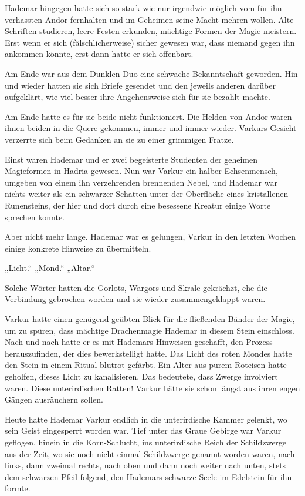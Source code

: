 \documentclass[10pt, a4paper, oneside]{book}
\begin{document}
Hademar hingegen hatte sich so stark wie nur irgendwie möglich vom für ihn verhassten Andor fernhalten und im Geheimen seine Macht mehren wollen. Alte Schriften studieren, leere Festen erkunden, mächtige Formen der Magie meistern. Erst wenn er sich (fälschlicherweise) sicher gewesen war, dass niemand gegen ihn ankommen könnte, erst dann hatte er sich offenbart.

Am Ende war aus dem Dunklen Duo eine schwache Bekanntschaft geworden. Hin und wieder hatten sie sich Briefe gesendet und den jeweils anderen darüber aufgeklärt, wie viel besser ihre Angehensweise sich für sie bezahlt machte.

Am Ende hatte es für sie beide nicht funktioniert. Die Helden von Andor waren ihnen beiden in die Quere gekommen, immer und immer wieder. Varkurs Gesicht verzerrte sich beim Gedanken an sie zu einer grimmigen Fratze.

Einst waren Hademar und er zwei begeisterte Studenten der geheimen Magieformen in Hadria gewesen. Nun war Varkur ein halber Echsenmensch, umgeben von einem ihn verzehrenden brennenden Nebel, und Hademar war nichts weiter als ein schwarzer Schatten unter der Oberfläche eines kristallenen Runensteins, der hier und dort durch eine besessene Kreatur einige Worte sprechen konnte.

Aber nicht mehr lange. Hademar war es gelungen, Varkur in den letzten Wochen einige konkrete Hinweise zu übermitteln.

„Licht.“ „Mond.“ „Altar.“

Solche Wörter hatten die Gorlots, Wargors und Skrale gekrächzt, ehe die Verbindung gebrochen worden und sie wieder zusammengeklappt waren.

Varkur hatte einen genügend geübten Blick für die fließenden Bänder der Magie, um zu spüren, dass mächtige Drachenmagie Hademar in diesem Stein einschloss. Nach und nach hatte er es mit Hademars Hinweisen geschafft, den Prozess herauszufinden, der dies bewerkstelligt hatte. Das Licht des roten Mondes hatte den Stein in einem Ritual blutrot gefärbt. Ein Alter aus purem Roteisen hatte geholfen, dieses Licht zu kanalisieren. Das bedeutete, dass Zwerge involviert waren. Diese unterirdischen Ratten! Varkur hätte sie schon längst aus ihren engen Gängen ausräuchern sollen.

Heute hatte Hademar Varkur endlich in die unterirdische Kammer gelenkt, wo sein Geist eingesperrt worden war. Tief unter das Graue Gebirge war Varkur geflogen, hinein in die Korn-Schlucht, ins unterirdische Reich der Schildzwerge aus der Zeit, wo sie noch nicht einmal Schildzwerge genannt worden waren, nach links, dann zweimal rechts, nach oben und dann noch weiter nach unten, stets dem schwarzen Pfeil folgend, den Hademars schwarze Seele im Edelstein für ihn formte.
\end{document}
